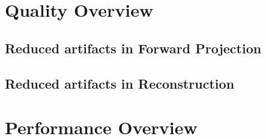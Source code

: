 
\section{Quality Overview}\label{sec:experiments_quality_projection}

\subsection{Reduced artifacts in Forward Projection}\label{sec:experiments_artifacts_forward}

\subsection{Reduced artifacts in Reconstruction}\label{sec:experiments_artifacts_reconstruction}

\section{Performance Overview}\label{sec:experiments_performance_projection}
